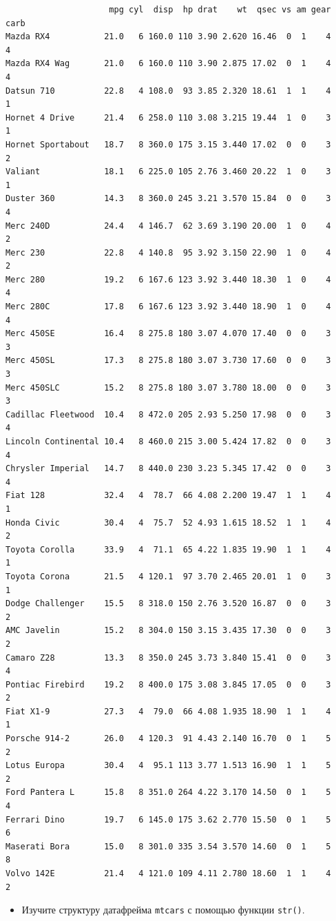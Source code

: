 \documentclass[
]{book}
\providecommand{\tightlist}{%
  \setlength{\itemsep}{0pt}\setlength{\parskip}{0pt}}
\begin{document}
\begin{verbatim}
                     mpg cyl  disp  hp drat    wt  qsec vs am gear carb
Mazda RX4           21.0   6 160.0 110 3.90 2.620 16.46  0  1    4    4
Mazda RX4 Wag       21.0   6 160.0 110 3.90 2.875 17.02  0  1    4    4
Datsun 710          22.8   4 108.0  93 3.85 2.320 18.61  1  1    4    1
Hornet 4 Drive      21.4   6 258.0 110 3.08 3.215 19.44  1  0    3    1
Hornet Sportabout   18.7   8 360.0 175 3.15 3.440 17.02  0  0    3    2
Valiant             18.1   6 225.0 105 2.76 3.460 20.22  1  0    3    1
Duster 360          14.3   8 360.0 245 3.21 3.570 15.84  0  0    3    4
Merc 240D           24.4   4 146.7  62 3.69 3.190 20.00  1  0    4    2
Merc 230            22.8   4 140.8  95 3.92 3.150 22.90  1  0    4    2
Merc 280            19.2   6 167.6 123 3.92 3.440 18.30  1  0    4    4
Merc 280C           17.8   6 167.6 123 3.92 3.440 18.90  1  0    4    4
Merc 450SE          16.4   8 275.8 180 3.07 4.070 17.40  0  0    3    3
Merc 450SL          17.3   8 275.8 180 3.07 3.730 17.60  0  0    3    3
Merc 450SLC         15.2   8 275.8 180 3.07 3.780 18.00  0  0    3    3
Cadillac Fleetwood  10.4   8 472.0 205 2.93 5.250 17.98  0  0    3    4
Lincoln Continental 10.4   8 460.0 215 3.00 5.424 17.82  0  0    3    4
Chrysler Imperial   14.7   8 440.0 230 3.23 5.345 17.42  0  0    3    4
Fiat 128            32.4   4  78.7  66 4.08 2.200 19.47  1  1    4    1
Honda Civic         30.4   4  75.7  52 4.93 1.615 18.52  1  1    4    2
Toyota Corolla      33.9   4  71.1  65 4.22 1.835 19.90  1  1    4    1
Toyota Corona       21.5   4 120.1  97 3.70 2.465 20.01  1  0    3    1
Dodge Challenger    15.5   8 318.0 150 2.76 3.520 16.87  0  0    3    2
AMC Javelin         15.2   8 304.0 150 3.15 3.435 17.30  0  0    3    2
Camaro Z28          13.3   8 350.0 245 3.73 3.840 15.41  0  0    3    4
Pontiac Firebird    19.2   8 400.0 175 3.08 3.845 17.05  0  0    3    2
Fiat X1-9           27.3   4  79.0  66 4.08 1.935 18.90  1  1    4    1
Porsche 914-2       26.0   4 120.3  91 4.43 2.140 16.70  0  1    5    2
Lotus Europa        30.4   4  95.1 113 3.77 1.513 16.90  1  1    5    2
Ford Pantera L      15.8   8 351.0 264 4.22 3.170 14.50  0  1    5    4
Ferrari Dino        19.7   6 145.0 175 3.62 2.770 15.50  0  1    5    6
Maserati Bora       15.0   8 301.0 335 3.54 3.570 14.60  0  1    5    8
Volvo 142E          21.4   4 121.0 109 4.11 2.780 18.60  1  1    4    2
\end{verbatim}

\begin{itemize}
\tightlist
\item
  Изучите структуру датафрейма \texttt{mtcars} с помощью функции \texttt{str()}.
\end{itemize}
\end{document}
